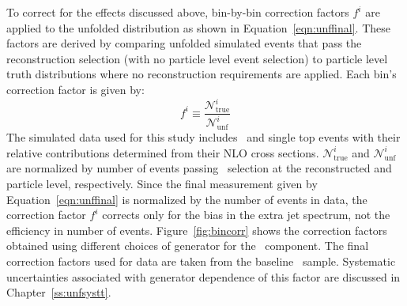 To correct for the effects discussed above, bin-by-bin correction factors $f^i$ are applied to the 
unfolded distribution as shown in Equation~\ref{eqn:unffinal}. These factors are derived by 
comparing unfolded simulated events that pass the reconstruction selection (with no particle level event selection) to
particle level truth distributions where no reconstruction requirements are applied.
Each bin's correction factor is given by:
\begin{equation}
f^i \equiv \frac{{\mathscr N}^i_{\textrm{true}}} {{\mathscr N}^i_{\textrm{unf}}}
\label{eqn:corrf}
\end{equation}
The simulated data used for this study includes \ttbar\ and single top events with their relative contributions determined
from their NLO cross sections. ${\mathscr N}^i_{\textrm{true}}$ and ${\mathscr N}^i_{\textrm{unf}}$ are normalized by number of events passing \emubb\ selection at the reconstructed and particle level, respectively. Since the final measurement given by Equation~\ref{eqn:unffinal} is normalized by the number of events in data, the correction factor $f^i$ corrects only for the bias in the extra jet spectrum, not the efficiency in number of events.
Figure~\ref{fig:bincorr} shows the correction factors obtained using different choices of generator for the \ttbar\ component.
The final correction factors used for data are taken from the baseline \powpy\ sample. Systematic uncertainties associated with generator dependence of this factor are discussed in Chapter~\ref{ss:unfsystt}.





